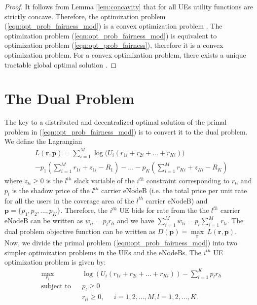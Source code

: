 \documentclass[conference]{IEEEtran}
\begin{document}
\begin{proof}
It follows from Lemma \ref{lem:concavity} that for all UEs utility functions are strictly concave. Therefore, the optimization problem (\ref{eqn:opt_prob_fairness_mod}) is a convex optimization problem \cite{Boyd2004}. The optimization problem (\ref{eqn:opt_prob_fairness_mod}) is equivalent to optimization problem (\ref{eqn:opt_prob_fairness}), therefore it is a convex optimization problem. For a convex optimization problem, there exists a unique tractable global optimal solution \cite{Boyd2004}.
\end{proof}

\section{The Dual Problem}\label{sec:Dual}

The key to a distributed and decentralized optimal solution of the primal problem in (\ref{eqn:opt_prob_fairness_mod}) is to convert it to the dual problem. We define the Lagrangian
\begin{equation}\label{eqn:lagrangian}
\begin{aligned}
& L(\textbf{r},\textbf{p}) =  \sum_{i=1}^{M}\log \Big(U_i(r_{1i} + r_{2i} + ... + r_{Ki})\Big)\\
& -p_1(\sum_{i=1}^{M}r_{1i} + z_{1i} - R_1) - ... - p_K(\sum_{i=1}^{M}r_{Ki} + z_{Ki} - R_K)
\end{aligned}
\end{equation}
where $z_{li}\geq 0$ is the $l^{th}$ slack variable of the $i^{th}$ constraint corresponding to $r_{li}$ and $p_l$ is the shadow price of the $l^{th}$ carrier eNodeB (i.e. the total price per unit rate for all the users in the coverage area of the $l^{th}$ carrier eNodeB) and $\textbf{p}=\{p_1,p_2,...,p_K\}$. Therefore, the $i^{th}$ UE bids for rate from the the $l^{th}$ carrier eNodeB can be written as $w_{li} = p_l r_{li}$ and we have $\sum_{i=1}^{M}w_{li} = p_l \sum_{i=1}^{M}r_{li}$. The dual problem objective function can be written as $D(\textbf{p}) =  \underset{{\textbf{r}}}\max \:L(\textbf{r},\textbf{p})$. Now, we divide the primal problem (\ref{eqn:opt_prob_fairness_mod}) into two simpler optimization problems in the UEs and the eNodeBs. The $i^{th}$ UE optimization problem is given by: 
\begin{equation}\label{eqn:opt_prob_fairness_UE}
\begin{aligned}
& \underset{{r_i}}{\text{max}}
& & \log(U_i(r_{1i} + r_{2i} + ... + r_{Ki}))-\sum_{l=1}^{K}p_lr_{li} \\
& \text{subject to}
& & p_l \geq 0\\
& & &  r_{li} \geq 0, \;\;\;\;\; i = 1,2, ...,M, l = 1,2, ...,K.
\end{aligned}
\end{equation}
\end{document}
